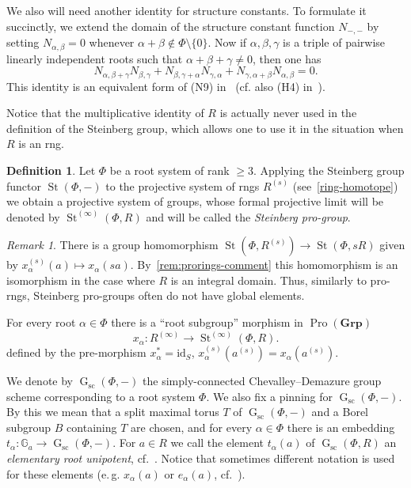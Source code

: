 \documentclass[oneside, 11pt]{amsart}
\numberwithin{equation}{section}
\theoremstyle{definition}
\newtheorem{df}[lemma]{Definition} \Crefname{df}{Definition}{Definitions}
\theoremstyle{remark}
\newtheorem{rem}[lemma]{Remark}
\DeclareMathOperator\St{St}
\DeclareMathOperator\GG{G}
\DeclareMathOperator{\Pro}{Pro}
\newcommand{\Group}{\mathbf{Grp}}
\begin{document}
We also will need another identity for structure constants.
To formulate it succinctly, we extend the domain of the structure constant function $N_{-,-}$ by setting $N_{\alpha, \beta} = 0$ whenever $\alpha+\beta\not\in\Phi\setminus\{0\}$.
Now if $\alpha, \beta, \gamma$ is a triple of pairwise linearly independent roots such that $\alpha+\beta+\gamma\neq 0$, then one has 
\begin{equation}\label{eq:cocycle2} N_{\alpha,\beta+\gamma} N_{\beta,\gamma} + N_{\beta,\gamma+\alpha} N_{\gamma,\alpha} + N_{\gamma,\alpha+\beta}N_{\alpha,\beta} = 0. \end{equation}
This identity is an equivalent form of (N9) in~\cite[\S~14]{VP} (cf. also (H4) in~\cite{Re75}).

Notice that the multiplicative identity of $R$ is actually never used in the definition of the Steinberg group, 
 which allows one to use it in the situation when $R$ is an rng.
\begin{df}\label{def:Steinberg-homotope}
 Let %
 $\Phi$ be a root system of rank $\geq 3$. Applying the Steinberg group functor $\St(\Phi, -)$ to the projective system of rngs $R^{(s)}$ (see~\cref{ring-homotope}) we obtain a projective system of groups, whose formal projective limit will be denoted by $\St^{(\infty)}(\Phi, R)$ and will be called the {\it Steinberg pro-group}. 
\end{df}

\begin{rem} \label{rem:pro-Steinberg-comment}
There is a group homomorphism $\St(\Phi, R^{(s)}) \to \St(\Phi, sR)$ given by $x_\alpha^{(s)}(a)\mapsto x_\alpha(sa)$. By~\cref{rem:prorings-comment} this homomorphism is an isomorphism in the case where $R$ is an integral domain. Thus, similarly to pro-rngs, Steinberg pro-groups often do not have global elements.
\end{rem}
 
For every root $\alpha \in \Phi$ there is a ``root subgroup'' morphism in $\Pro(\Group)$
\[x_{\alpha} \colon R^{(\infty)} \to \St^{(\infty)}(\Phi, R).\] 
defined by the pre-morphism $x_\alpha^* = \mathrm{id}_S$, $x_\alpha^{(s)}(a^{(s)}) = x_\alpha(a^{(s)})$.

We denote by $\GG_\mathrm{sc}(\Phi,-)$ the simply-connected Chevalley--Demazure group scheme corresponding to a root system $\Phi$.
We also fix a pinning for $\GG_\mathrm{sc}(\Phi,-)$. By this we mean that a split maximal torus $T$ of $\GG_\mathrm{sc}(\Phi,-)$ and a Borel subgroup $B$ containing $T$ are chosen, and for every $\alpha\in\Phi$ there is an embedding $t_\alpha\colon \mathbb{G}_a\to\GG_\mathrm{sc}(\Phi, -)$.
For $a \in R$ we call the element $t_\alpha(a)$ of $\GG_\mathrm{sc}(\Phi, R)$ an {\it elementary root unipotent}, cf.~\cite{VP}. Notice that sometimes different notation is used for these elements (e.\,g. $x_\alpha(a)$ or $e_\alpha(a)$, cf.~\cite{Ma69,St71,VP}).
\end{document}
